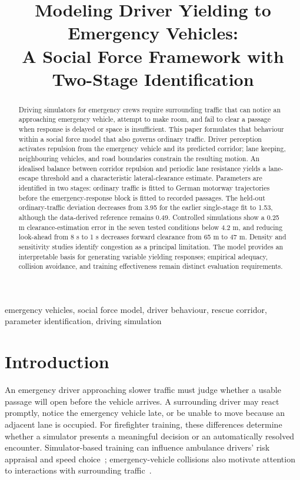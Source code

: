 \documentclass[conference,a4paper]{IEEEtran}
\begin{document}
\title{Modeling Driver Yielding to Emergency Vehicles:\\A Social Force Framework with Two-Stage Identification}
\author{
}
\maketitle
\begin{abstract}
Driving simulators for emergency crews require surrounding traffic that can notice an approaching emergency vehicle, attempt to make room, and fail to clear a passage when response is delayed or space is insufficient. This paper formulates that behaviour within a social force model that also governs ordinary traffic. Driver perception activates repulsion from the emergency vehicle and its predicted corridor; lane keeping, neighbouring vehicles, and road boundaries constrain the resulting motion. An idealised balance between corridor repulsion and periodic lane resistance yields a lane-escape threshold and a characteristic lateral-clearance estimate. Parameters are identified in two stages: ordinary traffic is fitted to German motorway trajectories before the emergency-response block is fitted to recorded passages. The held-out ordinary-traffic deviation decreases from 3.95 for the earlier single-stage fit to 1.53, although the data-derived reference remains 0.49. Controlled simulations show a 0.25 m clearance-estimation error in the seven tested conditions below 4.2 m, and reducing look-ahead from 8 s to 1 s decreases forward clearance from 65 m to 47 m. Density and sensitivity studies identify congestion as a principal limitation. The model provides an interpretable basis for generating variable yielding responses; empirical adequacy, collision avoidance, and training effectiveness remain distinct evaluation requirements.
\end{abstract}
\begin{IEEEkeywords}
emergency vehicles, social force model, driver behaviour, rescue corridor, parameter identification, driving simulation
\end{IEEEkeywords}

\section{Introduction}
An emergency driver approaching slower traffic must judge whether a usable passage will open before the vehicle arrives. A surrounding driver may react promptly, notice the emergency vehicle late, or be unable to move because an adjacent lane is occupied. For firefighter training, these differences determine whether a simulator presents a meaningful decision or an automatically resolved encounter. Simulator-based training can influence ambulance drivers' risk appraisal and speed choice~\cite{prohn20}; emergency-vehicle collisions also motivate attention to interactions with surrounding traffic~\cite{custalow04}.
\end{document}
